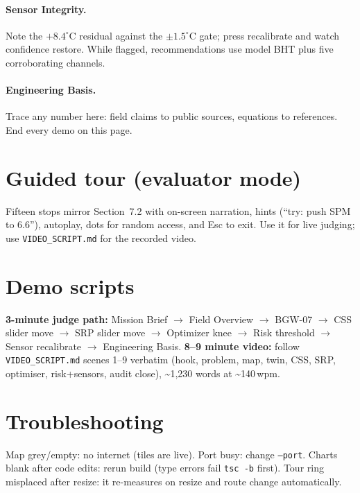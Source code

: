 \documentclass[12pt,a4paper]{report}
\begin{document}
\paragraph{Sensor Integrity.} Note the $+8.4^\circ$C residual against the
$\pm1.5^\circ$C gate; press recalibrate and watch confidence restore. While
flagged, recommendations use model BHT plus five corroborating channels.

\paragraph{Engineering Basis.} Trace any number here: field claims to public
sources, equations to references. End every demo on this page.

\section{Guided tour (evaluator mode)}
Fifteen stops mirror Section~7.2 with on-screen narration, hints (``try: push
SPM to 6.6''), autoplay, dots for random access, and Esc to exit. Use it for
live judging; use \texttt{VIDEO\_SCRIPT.md} for the recorded video.

\section{Demo scripts}
\textbf{3-minute judge path:} Mission Brief $\rightarrow$ Field Overview
$\rightarrow$ BGW-07 $\rightarrow$ CSS slider move $\rightarrow$ SRP slider
move $\rightarrow$ Optimizer knee $\rightarrow$ Risk threshold
$\rightarrow$ Sensor recalibrate $\rightarrow$ Engineering Basis.
\textbf{8--9 minute video:} follow \texttt{VIDEO\_SCRIPT.md} scenes 1--9
verbatim (hook, problem, map, twin, CSS, SRP, optimiser, risk+sensors, audit
close), \textasciitilde1,230 words at \textasciitilde140\,wpm.

\section{Troubleshooting}
Map grey/empty: no internet (tiles are live). Port busy: change \texttt{--port}.
Charts blank after code edits: rerun build (type errors fail \texttt{tsc -b}
first). Tour ring misplaced after resize: it re-measures on resize and
route change automatically.

\end{document}
